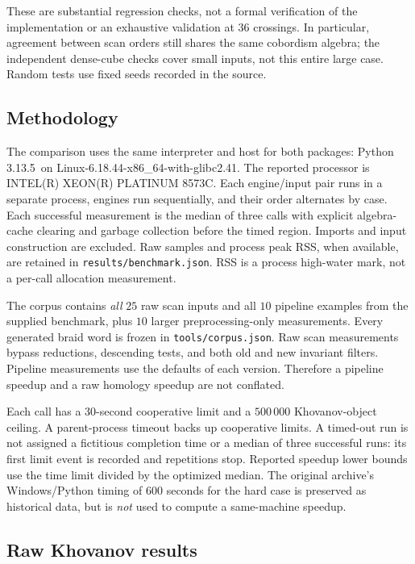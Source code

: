 \documentclass[11pt]{article}
\theoremstyle{remark}\newtheorem{remark}[theorem]{Remark}
\newcommand{\code}[1]{\texttt{\small #1}}
\newcommand{\TimeLimit}{30}
\newcommand{\PythonVersion}{Python 3.13.5}
\newcommand{\HostPlatform}{Linux-6.18.44-x86\_64-with-glibc2.41}
\newcommand{\CpuModel}{INTEL(R) XEON(R) PLATINUM 8573C}
\begin{document}
These are substantial regression checks, not a formal verification of the
implementation or an exhaustive validation at $36$ crossings. In particular,
agreement between scan orders still shares the same cobordism algebra;
the independent dense-cube checks cover small inputs, not this entire
large case. Random tests use fixed seeds recorded in the source.

\subsection{Methodology}

The comparison uses the same interpreter and host for both packages:
\PythonVersion\ on \HostPlatform. The reported processor is
\CpuModel. Each engine/input pair runs in a separate process, engines
run sequentially, and their order alternates by case. Each successful
measurement is the median of three calls with explicit algebra-cache
clearing and garbage collection before the timed region. Imports and input
construction are excluded. Raw samples and process peak RSS, when available,
are retained in \code{results/benchmark.json}. RSS is a process high-water
mark, not a per-call allocation measurement.

The corpus contains \emph{all} $25$ raw scan inputs and all $10$ pipeline
examples from the supplied benchmark, plus $10$ larger preprocessing-only
measurements. Every generated braid word is frozen in
\code{tools/corpus.json}. Raw scan measurements bypass reductions,
descending tests, and both old and new invariant filters. Pipeline
measurements use the defaults of each version. Therefore a pipeline
speedup and a raw homology speedup are not conflated.

Each call has a \TimeLimit-second cooperative limit and a $500\,000$
Khovanov-object ceiling. A parent-process timeout backs up cooperative
limits. A timed-out run is not assigned a fictitious completion time or a
median of three successful runs: its first limit event is recorded and
repetitions stop. Reported speedup lower bounds use the time limit divided
by the optimized median. The original archive's Windows/Python timing of
$600$ seconds for the hard case is preserved as historical data, but is
\emph{not} used to compute a same-machine speedup.

\subsection{Raw Khovanov results}
\end{document}
